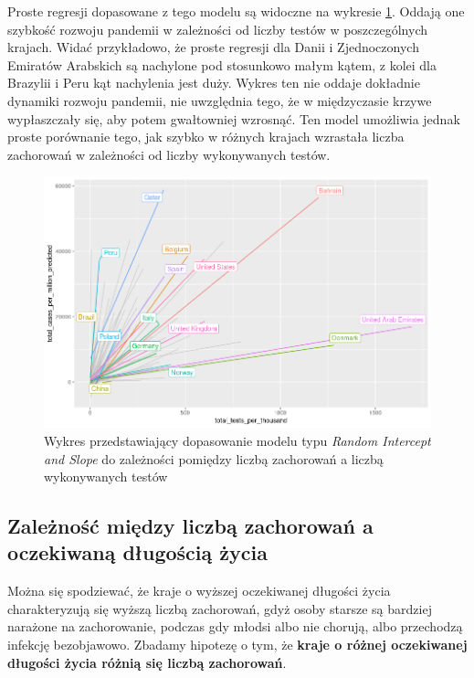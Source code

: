 \documentclass[12pt]{mwbk}
\theoremstyle{plain}
\theoremstyle{definition}
\theoremstyle{definition}
\newcommand\zrodlo[1]{\par\vspace{-3mm}{\small\textit{Źródło: }#1 }}
\begin{document}
Proste regresji dopasowane z tego modelu są widoczne na wykresie \ref{fig:mod2-slope}. Oddają one szybkość rozwoju pandemii w zależności od liczby testów w poszczególnych krajach. Widać przykładowo, że proste regresji dla Danii i Zjednoczonych Emiratów Arabskich są nachylone pod stosunkowo małym kątem, z kolei dla Brazylii i Peru kąt nachylenia jest duży. Wykres ten nie oddaje dokładnie dynamiki rozwoju pandemii, nie uwzględnia tego, że w międzyczasie krzywe wypłaszczały się, aby potem gwałtowniej wzrosnąć. Ten model umożliwia jednak proste porównanie tego, jak szybko w różnych krajach wzrastała liczba zachorowań w zależności od liczby wykonywanych testów.
\newpage
\begin{figure}[!h]
	\centering
	\includegraphics[width=\linewidth]{rys/mod2_slope_predict.png}
	\caption{Wykres przedstawiający dopasowanie modelu typu \textit{Random Intercept and Slope} do zależności pomiędzy liczbą zachorowań a liczbą wykonywanych testów}
	\label{fig:mod2-slope}
	\zrodlo{Opracowanie własne}
\end{figure}




\subsection{Zależność między liczbą zachorowań a oczekiwaną długością życia}

Można się spodziewać, że kraje o wyższej oczekiwanej długości życia charakteryzują się wyższą liczbą zachorowań, gdyż osoby starsze są bardziej narażone na zachorowanie, podczas gdy młodsi albo nie chorują, albo przechodzą infekcję bezobjawowo. Zbadamy hipotezę o tym, że \textbf{kraje o różnej oczekiwanej długości życia różnią się liczbą zachorowań}.
\end{document}
